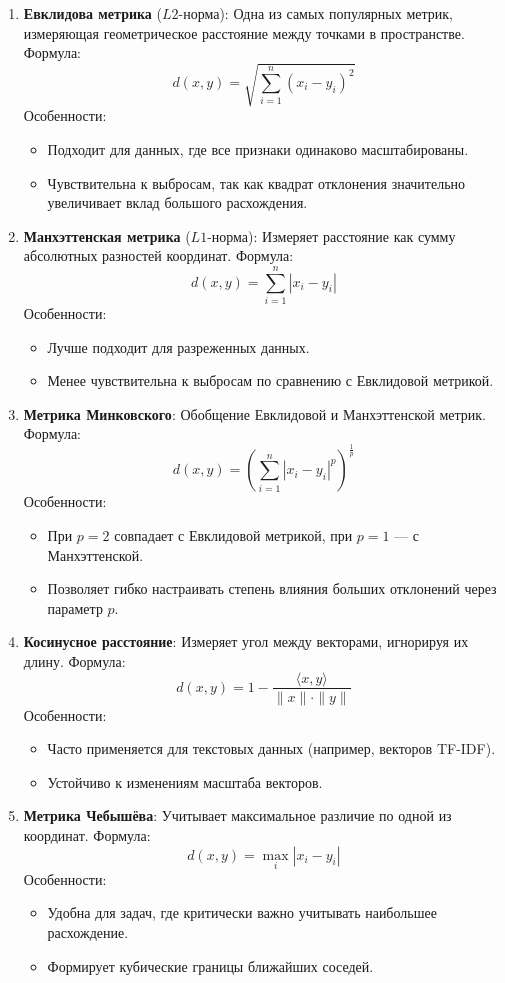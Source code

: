 \begin{enumerate}
    \item \textbf{Евклидова метрика} (\(L2\)-норма):
    Одна из самых популярных метрик, измеряющая геометрическое расстояние между точками в пространстве.
    Формула:
    \[
    d(x, y) = \sqrt{\sum_{i=1}^{n}(x_i - y_i)^2}
    \]
    Особенности:
    \begin{itemize}
        \item Подходит для данных, где все признаки одинаково масштабированы.
        \item Чувствительна к выбросам, так как квадрат отклонения значительно увеличивает вклад большого расхождения.
    \end{itemize}

    \item \textbf{Манхэттенская метрика} (\(L1\)-норма):
    Измеряет расстояние как сумму абсолютных разностей координат.
    Формула:
    \[
    d(x, y) = \sum_{i=1}^{n}|x_i - y_i|
    \]
    Особенности:
    \begin{itemize}
        \item Лучше подходит для разреженных данных.
        \item Менее чувствительна к выбросам по сравнению с Евклидовой метрикой.
    \end{itemize}

    \item \textbf{Метрика Минковского}:
    Обобщение Евклидовой и Манхэттенской метрик.
    Формула:
    \[
    d(x, y) = \left(\sum_{i=1}^{n}|x_i - y_i|^p\right)^{\frac{1}{p}}
    \]
    Особенности:
    \begin{itemize}
        \item При \(p=2\) совпадает с Евклидовой метрикой, при \(p=1\) — с Манхэттенской.
        \item Позволяет гибко настраивать степень влияния больших отклонений через параметр \(p\).
    \end{itemize}

    \item \textbf{Косинусное расстояние}:
    Измеряет угол между векторами, игнорируя их длину.
    Формула:
    \[
    d(x, y) = 1 - \frac{\langle x, y \rangle}{\|x\| \cdot \|y\|}
    \]
    Особенности:
    \begin{itemize}
        \item Часто применяется для текстовых данных (например, векторов TF-IDF).
        \item Устойчиво к изменениям масштаба векторов.
    \end{itemize}

    \item \textbf{Метрика Чебышёва}:
    Учитывает максимальное различие по одной из координат.
    Формула:
    \[
    d(x, y) = \max_{i}|x_i - y_i|
    \]
    Особенности:
    \begin{itemize}
        \item Удобна для задач, где критически важно учитывать наибольшее расхождение.
        \item Формирует кубические границы ближайших соседей.
    \end{itemize}
\end{enumerate}

